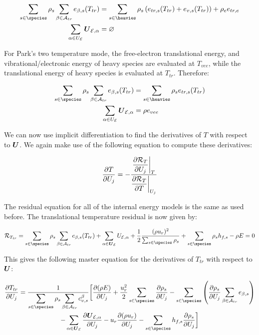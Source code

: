 \documentclass[10pt]{article}
\begin{document}
\begin{flushleft}
\begin{align*}
    \sum_{s \in \species} \rho_s \sum_{\beta \in \mathcal{A}_{tr}} e_{\beta,s} (T_{tr}) &= \sum_{s \in \heavies} \rho_s \bp{e_{tr,s} (T_{tr}) + e_{v,s} (T_{tr})} + \rho_e e_{tr,e} \\
    \sum_{\alpha \in U_{\mathcal{E}}} \bigU_{\mathcal{E},\alpha} &= \varnothing
\end{align*}

For Park's two temperature mode, the free-electron translational energy, and vibrational/electronic energy of heavy species are evaluated at $T_{vee}$, while the translational energy of heavy species is evaluated at $T_{tr}$. Therefore:

\begin{align*}
    \sum_{s \in \species} \rho_s \sum_{\beta \in \mathcal{A}_{tr}} e_{\beta,s} (T_{tr}) &= \sum_{s \in \heavies} \rho_s e_{tr,s} (T_{tr}) \\
    \sum_{\alpha \in U_{\mathcal{E}}} \bigU_{\mathcal{E},\alpha} &= \rho e_{vee}
\end{align*}

We can now use implicit differentiation to find the derivatives of $T$ with respect to $\boldsymbol{U}$. We again make use of the following equation to compute these derivatives:


\begin{equation}
\frac{\partial T}{\partial U_j} = - \frac{ \displaystyle \frac{\partial \mathcal{R}_T}{\partial U_j} \bigg|_T}{ \displaystyle \frac{\partial \mathcal{R}_T}{\partial T} \bigg|_{U_j}}
\end{equation}

The residual equation for all of the internal energy models is the same as used before. The translational temperature residual is now given by:

\begin{equation}
    \mathcal{R}_{T_{tr}} = \sum_{s \in \species} \rho_s \sum_{\beta \in \mathcal{A}_{tr}} e_{\beta,s} (T_{tr}) + \sum_{\alpha \in \bigU_{\mathcal{E}}} U_{\mathcal{E},\alpha} + \frac{1}{2}\frac{(\rho u_r)^2}{\sum_{s \in \species} \rho_s} + \sum_{s \in \species} \rho_s h_{f,s} - \rho E = 0
\end{equation}

This gives the following master equation for the derivatives of $T_{tr}$ with respect to $\boldsymbol{U}$:

\begin{multline}
    \pd{T_{tr}}{U_j} = \frac{1}{\displaystyle \sum_{s \in \species} \rho_s \sum_{\beta \in \mathcal{A}_{tr}} c_{v,s}^{\beta}} \bigg[\pd{(\rho E)}{U_j} + \frac{u_r^2}{2} \sum_{s \in \species} \pd{\rho_s}{U_j} - \sum_{s \in \species} \bp{\pd{\rho_s}{U_j} \sum_{\beta \in \mathcal{A}_{tr}} e_{\beta,s}} \\
    - \sum_{\alpha \in \bigU_{\mathcal{E}}} \pd{\bigU_{\mathcal{E},\alpha}}{U_j} - u_r \pd{(\rho u_r)}{U_j} - \sum_{s \in \species} h_{f,s} \pd{\rho_s}{U_j} \bigg]
\end{multline}


\end{flushleft}
\end{document}
